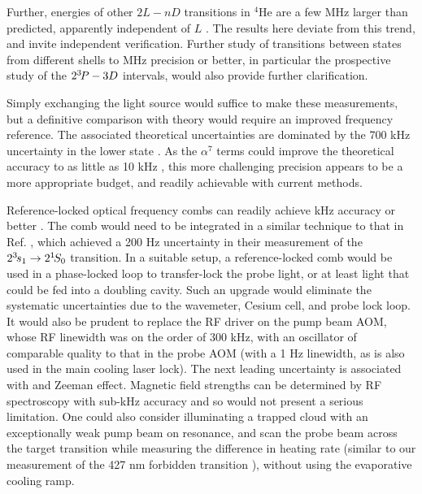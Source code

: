 	{Further, energies of other $2L-nD$ transitions in $^4$He are a few MHz larger than predicted, apparently independent of $L$ \cite{Wienczek19,Yerokhin20}.
	The results here deviate from this trend, and invite independent verification.
	Further study of transitions between states from different shells to MHz precision or better, in particular the prospective study of the $2^{3\!} P - 3 D$ intervals, would also provide further clarification.}

	Simply exchanging the light source would suffice to make these measurements, but a definitive comparison with theory would require an improved frequency reference.
	The associated theoretical uncertainties are dominated by the 700 kHz uncertainty in the lower state \cite{Pachucki17,Wienczek19}.
	As the $\alpha^7$ terms could improve the theoretical accuracy to as little as 10 kHz \cite{Pachucki17}, this more challenging precision appears to be a more appropriate budget, and readily achievable with current methods.
	
	Reference-locked optical frequency combs can readily achieve kHz accuracy or better \cite{Luo15,Rengelink18}.
	The comb would need to be integrated in a similar technique to that in Ref. \cite{Rengelink18}, which achieved a 200 Hz uncertainty in their measurement of the $2^{3\!} s_1 \rightarrow 2^{1\!} S_0$ transition.
	In a suitable setup, a reference-locked comb would be used in a phase-locked loop to transfer-lock the probe light, or at least light that could be fed into a doubling cavity.
	Such an upgrade would eliminate the systematic uncertainties due to the wavemeter, Cesium cell, and probe lock loop.
	It would also be prudent to replace the RF driver on the pump beam AOM, whose RF linewidth was on the order of 300 kHz, with an oscillator of comparable quality to that in the probe AOM (with a 1 Hz linewidth, as is also used in the main cooling laser lock).
	The next leading uncertainty is associated with and Zeeman effect.
	Magnetic field strengths can be determined by RF spectroscopy with sub-kHz accuracy and so would not present a serious limitation.
	One could also consider illuminating a trapped cloud with an exceptionally weak pump beam on resonance, and scan the probe beam across the target transition while measuring the difference in heating rate (similar to our measurement of the  427 nm forbidden transition \cite{Thomas20}), without using the evaporative cooling ramp. 

